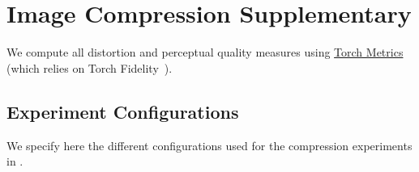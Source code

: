 

\section{Image Compression Supplementary}\label{app:compression_details}

We compute all distortion and perceptual quality measures using \href{https://github.com/Lightning-AI/torchmetrics}{Torch Metrics} (which relies on Torch Fidelity~\citep{obukhov2020torchfidelity}).

\subsection{Experiment Configurations}\label{app:image-compression-experiments-configuration}
We specify here the different configurations used for the compression experiments in .
